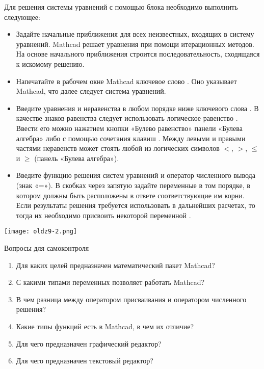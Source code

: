 Для решения системы уравнений с помощью блока  необходимо выполнить следующее:
\begin{itemize}
	\item Задайте начальные приближения для всех неизвестных, входящих в систему уравнений. Mathcad решает уравнения при помощи итерационных методов. На основе начального приближения строится последовательность, сходящаяся к искомому решению. 
	\item Напечатайте в рабочем окне Mathcad ключевое слово . Оно указывает Mathcad, что далее следует система уравнений.
	\item Введите уравнения и неравенства в любом порядке ниже ключевого слова . В качестве знаков равенства следует использовать логическое равенство . Ввести его можно нажатием кнопки «Булево равенство» панели «Булева алгебра» либо с помощью сочетания клавиш \keys{\ctrl+ =}. Между левыми и правыми частями неравенств может стоять любой из логических символов $<$, $>$, $\leqslant$ и $\geqslant$ (панель «Булева алгебра»).
	\item Введите функцию решения систем уравнений  и оператор численного вывода (знак «=»). В скобках через запятую задайте переменные в том порядке, в котором должны быть расположены в ответе соответствующие им корни. Если результаты решения требуется использовать в дальнейших расчетах, то тогда их необходимо присвоить некоторой переменной .
\end{itemize}


\begin{center}
	\texttt{[image: oldz9-2.png]}
\end{center}



Вопросы для самоконтроля
\begin{enumerate}
	\item Для каких целей предназначен математический пакет Mathcad?
	\item С какими типами переменных позволяет работать Mathcad?
	\item В чем разница между оператором присваивания и оператором численного решения?
	\item Какие типы функций есть в Mathcad, в чем их отличие?
	\item  Для чего предназначен графический редактор?
	\item Для чего предназначен текстовый редактор?
\end{enumerate}